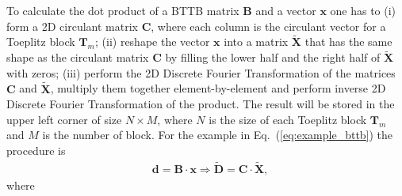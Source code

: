 \documentclass[
pra%
,preprint%
,amssymb, nobibnotes, aps, superscriptaddress, floatfix]{revtex4}
\begin{document}
To calculate the dot product of a BTTB matrix $\mathbf{B}$ and a vector $\mathbf{x}$ one has to (i) form a 2D circulant matrix $\mathbf{C}$, where each column is the circulant vector for a Toeplitz block $\mathbf{T}_m$; (ii) reshape the vector $\mathbf{x}$ into a matrix $\mathbf{\tilde{X}}$ that has the same shape as the circulant matrix $\mathbf{C}$ by filling the lower half and the right half of $\mathbf{\tilde{X}}$ with zeros; (iii) perform the 2D Discrete Fourier Transformation of the matrices $\mathbf{C}$ and $\mathbf{\tilde{X}}$, multiply them together element-by-element and perform inverse 2D Discrete Fourier Transformation of the product. The result will be stored in the upper left corner of size $N \times M$, where $N$ is the size of each Toeplitz block $\mathbf{T}_m$ and $M$ is the number of block. For the example in Eq.~(\ref{eq:example_bttb}) the procedure is
\begin{align}
&\mathbf{d} = \mathbf{B} \cdot \mathbf{x} \Rightarrow \mathbf{\tilde{D}} 
= \mathbf{C} \cdot \mathbf{\tilde{X}}, \nonumber
\end{align}
where
\end{document}
